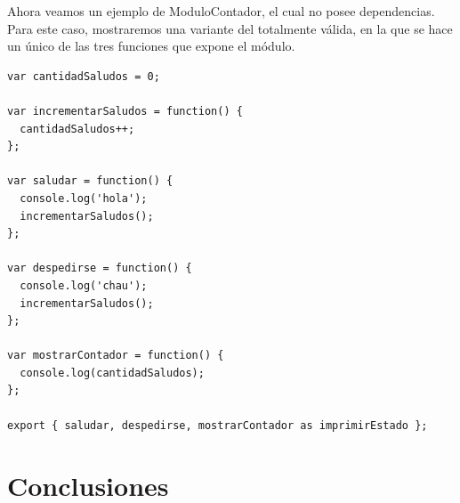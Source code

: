 Ahora veamos un ejemplo de ModuloContador, el cual no posee dependencias. Para este caso, mostraremos una variante del  totalmente válida, en la que se hace un único  de las tres funciones que expone el módulo.

\begin{lstlisting}[title={Modulo contador en ES6}]
var cantidadSaludos = 0;

var incrementarSaludos = function() {
  cantidadSaludos++;
};

var saludar = function() {
  console.log('hola');
  incrementarSaludos();
};

var despedirse = function() {
  console.log('chau');
  incrementarSaludos();
};

var mostrarContador = function() {
  console.log(cantidadSaludos);
};

export { saludar, despedirse, mostrarContador as imprimirEstado };
\end{lstlisting}

\section{Conclusiones}

